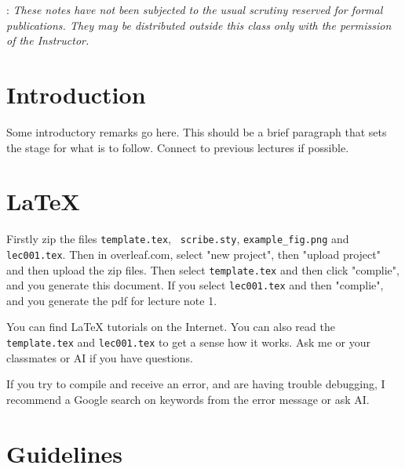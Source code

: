 \documentclass{article}
\theoremstyle{plain}
\theoremstyle{definition}
\begin{document}

: {\it These notes have not been subjected to
the usual scrutiny reserved for formal publications.  They may be
distributed outside this class only with the permission of the
Instructor.} %

\section{Introduction}

Some introductory remarks go here. This should be a brief paragraph that
sets the stage for what is to follow.  Connect to previous lectures if
possible.

\section{\LaTeX}

Firstly zip the files {\tt template.tex}, {\tt
scribe.sty},  {\tt example\_fig.png}  and {\tt lec001.tex}. Then in overleaf.com, select "new project", then "upload project" and then upload the zip files.  Then select {\tt template.tex} and then click "complie", and you generate this document. If you select {\tt lec001.tex} and then "complie", and you generate the pdf for lecture note 1.



You can find LaTeX tutorials on the Internet. %
You can also read the {\tt template.tex} and {\tt lec001.tex} to get a sense how it works. Ask me or your classmates or AI if you
have questions.

If you try to compile and receive an error, and are having trouble
debugging, I recommend a Google search on keywords from the error message or ask AI.

\section{Guidelines}
\end{document}
